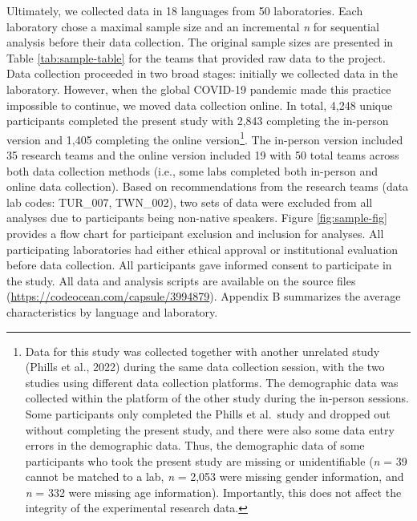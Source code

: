 \documentclass[
  man,mask,floatsintext]{apa7}
\begin{document}
Ultimately, we collected data in 18
languages from 50
laboratories. Each laboratory chose a maximal sample size and an
incremental \emph{n} for sequential analysis before their data collection.
The original sample sizes are presented in Table \ref{tab:sample-table}
for the teams that provided raw data to the project. Data collection
proceeded in two broad stages: initially we collected data in the
laboratory. However, when the global COVID-19 pandemic made this
practice impossible to continue, we moved data collection online. In
total,
4,248
unique participants completed the present study with
2,843
completing the in-person version and
1,405
completing the online version\footnote{Data for this study was collected together with another unrelated
  study (Phills et al., 2022) during the same data collection
  session, with the two studies using different data collection
  platforms. The demographic data was collected within the platform of
  the other study during the in-person sessions. Some participants
  only completed the Phills et al.~study and dropped out without
  completing the present study, and there were also some data entry
  errors in the demographic data. Thus, the demographic data of some
  participants who took the present study are missing or
  unidentifiable (\emph{n} =
  39
  cannot be matched to a lab, \emph{n} =
  2,053
  were missing gender information, and \emph{n} =
  332 were missing age
  information). Importantly, this does not affect the integrity of the
  experimental research data.}. The in-person version included
35
research teams and the online version included
19
with 50 total teams across both data
collection methods (i.e., some labs completed both in-person and online
data collection). Based on recommendations from the research teams (data
lab codes: TUR\_007, TWN\_002), two sets of data were excluded from all
analyses due to participants being non-native speakers. Figure
\ref{fig:sample-fig} provides a flow chart for participant exclusion
and inclusion for analyses. All participating laboratories had either
ethical approval or institutional evaluation before data collection. All participants gave informed consent to participate in the study. All
data and analysis scripts are available on the source files
(\url{https://codeocean.com/capsule/3994879}). Appendix B summarizes the
average characteristics by language and laboratory.
\end{document}
